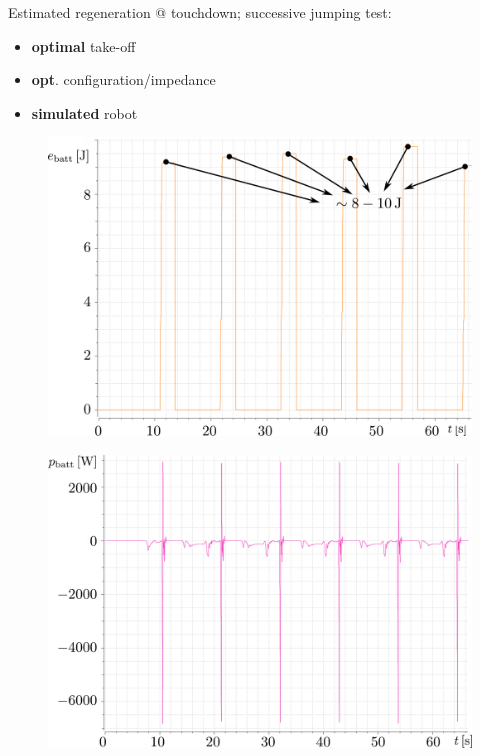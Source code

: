 \documentclass[aspectratio=169]{beamer}
\begin{document}


\begin{frame}
Estimated regeneration @ touchdown; successive jumping test:
\begin{itemize}
\item \textbf{optimal} take-off
\item \textbf{opt}. configuration/impedance
\item \textbf{simulated} robot
\end{itemize}
\begin{multicols}{2}
\begin{figure}
    \centering
    \includegraphics[width=1.0\columnwidth]{beamer_imgs/e_batt_sim.pdf}
\end{figure}
\vfill\null
\columnbreak
\centering
\begin{figure}
\includegraphics[width=1.0\columnwidth]{beamer_imgs/p_batt_sim.pdf}
\end{figure}
\vfill\null
\end{multicols}
\end{frame}


\titleframe
\end{document}
